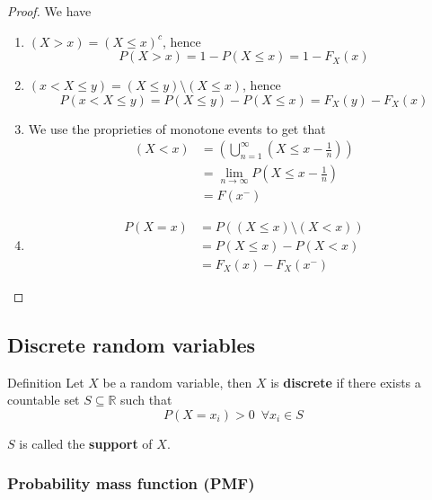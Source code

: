 \documentclass[10pt]{extarticle}
\newcommand{\R}{\mathbb{R}}
\begin{document}
\begin{proof}
    We have
    \begin{enumerate}
        \item $(X > x) = (X \leq x)^c$, hence
              $$
                  P(X > x) = 1 - P(X \leq x) = 1 - F_X(x)
              $$
        \item $(x < X \leq y) = (X \leq y) \setminus (X \leq x)$, hence
              $$
                  P(x < X \leq y) = P(X \leq y) - P(X \leq x) = F_X(y) - F_X(x)
              $$
        \item We use the proprieties of monotone events to get that
              \begin{align*}
                  (X < x) & = \left(\bigcup^\infty_{n = 1} \left(X \leq x - \frac{1}{n}\right)\right) \\
                          & = \lim_{n \to \infty} P\left(X \leq x - \frac{1}{n}\right)                \\
                          & = F(x^-)
              \end{align*}
        \item
              \begin{align*}
                  P(X = x) & = P\left((X \leq x) \setminus (X < x)\right) \\
                           & = P(X \leq x) - P(X < x)                     \\
                           & = F_X(x) - F_X(x^-)
              \end{align*}
    \end{enumerate}
\end{proof}

\subsection{Discrete random variables}

\begin{bluebox}{Definition}
    Let $X$ be a random variable, then $X$ is \textbf{discrete} if there exists a countable set $S \subseteq \R$ such that
    $$
        P(X = x_i) > 0 \enspace \forall x_i \in S
    $$
\end{bluebox}

$S$ is called the \textbf{support} of $X$.

\subsubsection{Probability mass function (PMF)}
\end{document}
